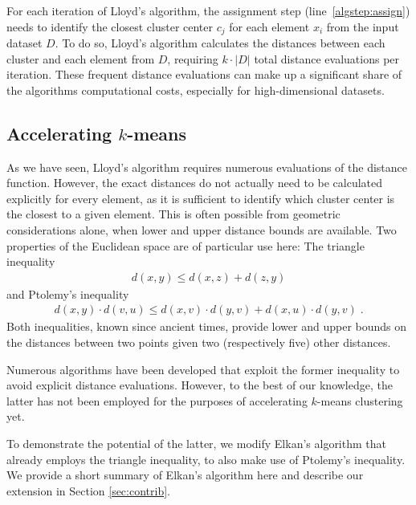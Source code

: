 For each iteration of Lloyd's algorithm, the assignment step (line~\autoref{algstep:assign}) needs to identify the closest cluster center $c_j$ for each element $x_i$ from the input dataset $D$.
To do so, Lloyd's algorithm calculates the distances between each cluster and each element from $D$, requiring $k\cdot|D|$ total distance evaluations per iteration.
These frequent distance evaluations can make up a significant share of the algorithms computational costs, especially for high-dimensional datasets.


\subsection{Accelerating $k$-means}
\label{sub:acc}



As we have seen, Lloyd's algorithm requires numerous evaluations of the distance function.
However, the exact distances do not actually need to be calculated explicitly for every element, as it is sufficient to identify which cluster center is the closest to a given element.
This is often possible from geometric considerations alone, when lower and upper distance bounds are available.
Two properties of the Euclidean space are of particular use here:
The triangle inequality
\begin{align}
	\label{eq:tri}
	d(x,y) \leq d(x,z) + d(z,y)
\end{align}
and Ptolemy's inequality
\begin{align}
	\label{eq:pto}
	d(x, y)\cdot d(v, u) \leq d(x, v) \cdot d(y,v) + d(x, u) \cdot d(y, v)\;.
\end{align}
Both inequalities, known since ancient times, provide lower and upper bounds on the distances between two points given two (respectively five) other distances.

Numerous algorithms have been developed that exploit the former inequality to avoid explicit distance evaluations. However, to the best of our knowledge, the latter has not been employed for the purposes of accelerating $k$-means clustering yet.

To demonstrate the potential of the latter, we modify Elkan's algorithm \cite{DBLP:conf/icml/Elkan03} that already employs the triangle inequality, to also make use of Ptolemy's inequality.
We provide a short summary of Elkan's algorithm here and describe our extension in Section \ref{sec:contrib}.

